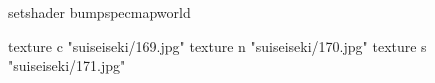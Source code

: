 setshader bumpspecmapworld

    texture c "suiseiseki/169.jpg"
    texture n "suiseiseki/170.jpg"
    texture s "suiseiseki/171.jpg"
